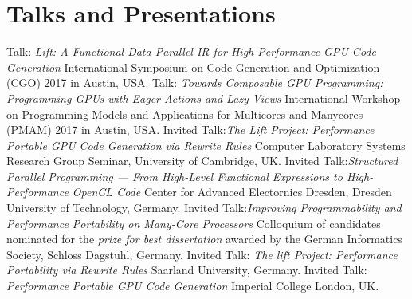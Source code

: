 \documentclass[11pt,a4paper]{moderncv}
\begin{document}
\newrefcontext[labelprefix=T]
\printbibliography[keyword=thesis,title={Thesis},heading=subbibliography]

\newrefcontext[labelprefix=B]
\printbibliography[keyword=book,title={Book Chapter},heading=subbibliography]

\newrefcontext[labelprefix=S]
\printbibliography[keyword=submission,title={Papers currently in submission},heading=subbibliography]

\section{Talks and Presentations}
         {Talk: \emph{Lift: A Functional Data-Parallel IR for High-Performance GPU Code Generation}\newline
          \small International Symposium on Code Generation and Optimization (CGO) 2017 in Austin, USA.}
         {Talk: \emph{Towards Composable GPU Programming: Programming GPUs with Eager Actions and Lazy Views}\newline
          \small  International Workshop on Programming Models and Applications for Multicores and Manycores (PMAM) 2017 in Austin, USA.}
         {Invited Talk:\newline \emph{The Lift Project: Performance Portable GPU Code Generation via Rewrite Rules}\newline
         Computer Laboratory Systems Research Group Seminar, University of Cambridge, UK.
         }
         {Invited Talk:\newline \emph{Structured Parallel Programming --- From High-Level Functional Expressions to High-Performance OpenCL Code}\newline
         Center for Advanced Electornics Dresden, Dresden University of Technology, Germany.
         }
         {Invited Talk:\newline \emph{Improving Programmability and Performance Portability on Many-Core Processors}\newline
         \small Colloquium of candidates nominated for the \emph{prize for best dissertation} awarded by the German Informatics Society, Schloss Dagstuhl, Germany.}
         {Invited Talk: \emph{The lift Project: Performance Portability via Rewrite Rules}\newline
          Saarland University, Germany.}
         {Invited Talk: \emph{Performance Portable GPU Code Generation}\newline
         \small Imperial College London, UK.}
\end{document}
